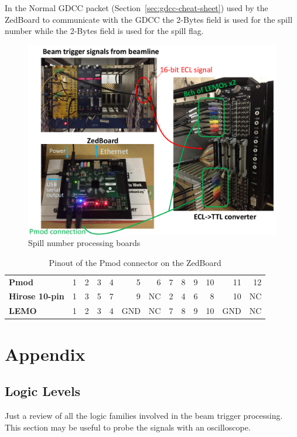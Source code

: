 In the Normal GDCC packet (Section~\ref{sec:gdcc-cheat-sheet}) used by the
ZedBoard to communicate with the GDCC the 2-Bytes  field
is used for the spill number while the 2-Bytes 
field is used for the spill flag.
\begin{figure}[H]
  \centering \includegraphics[width=\linewidth]{cables-spill-number}
  \caption{Spill number processing boards}\label{fig:cables-spill-number}
\end{figure}
\begin{table}[H]
  \centering
  \begin{tabular}{|l|r r r r r r r r r r r r|}
    \hline
    \textbf{Pmod} & 1 & 2 & 3 & 4 & 5 & 6 & 7 & 8 & 9 & 10 & 11 & 12 \\
    \textbf{Hirose 10-pin} & 1 & 3 & 5 & 7 & 9 & NC & 2 & 4 & 6 & 8 & 10 & NC\\
    \textbf{LEMO} & 1 & 2 & 3 & 4 & GND & NC & 7 & 8 & 9 & 10 & GND & NC \\
    \hline
  \end{tabular}
  \caption{Pinout of the Pmod connector on the ZedBoard}
\end{table}

\chapter{Appendix}

\section{Logic Levels}
Just a review of all the logic families involved in the beam trigger processing.
This section may be useful to probe the signals with an oscilloscope.
